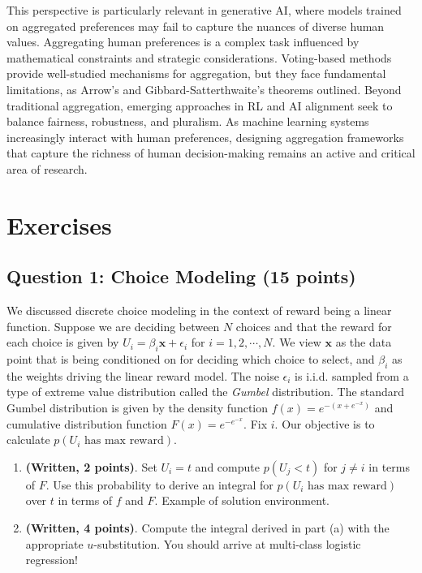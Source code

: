 \documentclass[
  letterpaper,
  numbers=noenddot,
  DIV=11]{scrreprt}
\theoremstyle{plain}
\theoremstyle{definition}
\theoremstyle{plain}
\theoremstyle{remark}
\begin{document}
This perspective is particularly relevant in generative AI, where models
trained on aggregated preferences may fail to capture the nuances of
diverse human values. Aggregating human preferences is a complex task
influenced by mathematical constraints and strategic considerations.
Voting-based methods provide well-studied mechanisms for aggregation,
but they face fundamental limitations, as Arrow's and
Gibbard-Satterthwaite's theorems outlined. Beyond traditional
aggregation, emerging approaches in RL and AI alignment seek to balance
fairness, robustness, and pluralism. As machine learning systems
increasingly interact with human preferences, designing aggregation
frameworks that capture the richness of human decision-making remains an
active and critical area of research.

\section{Exercises}\label{exercises}

\subsection*{Question 1: Choice Modeling (15
points)}\label{question-1-choice-modeling-15-points}

We discussed discrete choice modeling in the context of reward being a
linear function. Suppose we are deciding between \(N\) choices and that
the reward for each choice is given by
\(U_i=\beta_i\mathbf{x}+\epsilon_i\) for \(i=1, 2, \cdots, N\). We view
\(\mathbf{x}\) as the data point that is being conditioned on for
deciding which choice to select, and \(\beta_i\) as the weights driving
the linear reward model. The noise \(\epsilon_i\) is i.i.d. sampled from
a type of extreme value distribution called the \emph{Gumbel}
distribution. The standard Gumbel distribution is given by the density
function \(f(x)=e^{-(x+e^{-x})}\) and cumulative distribution function
\(F(x)=e^{-e^{-x}}.\) Fix \(i\). Our objective is to calculate
\(p(U_i\,\, \text{has max reward})\).

\begin{enumerate}
\def\labelenumi{(\alph{enumi})}
\item
  \textbf{(Written, 2 points)}. Set \(U_i=t\) and compute \(p(U_j<t)\)
  for \(j\neq i\) in terms of \(F\). Use this probability to derive an
  integral for \(p(U_i\,\,  \text{has max reward})\) over \(t\) in terms
  of \(f\) and \(F\). Example of solution environment.
\item
  \textbf{(Written, 4 points)}. Compute the integral derived in part (a)
  with the appropriate \(u\)-substitution. You should arrive at
  multi-class logistic regression!
\end{enumerate}
\end{document}
